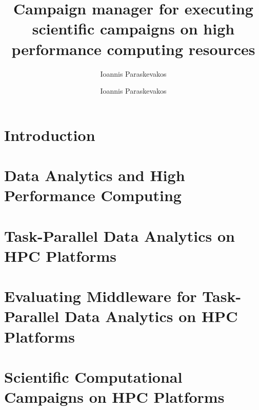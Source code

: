 \documentclass[final]{ruthesis}
\begin{document}
\author{Ioannis Paraskevakos}
\copyrightp
\title{Campaign manager for executing scientific campaigns on high performance computing resources}
\author{Ioannis Paraskevakos}
\figurespage
\tablespage

\abstract{}
\acknowledgements{}

\beforepreface
\afterpreface

\chapter{Introduction}
\label{ch:intro}


\chapter{Data Analytics and High Performance Computing}
\label{ch:pilot-data-hadoop}


\chapter{Task-Parallel Data Analytics on HPC Platforms}
\label{ch:task-par}


\chapter{Evaluating Middleware for Task-Parallel Data Analytics on HPC Platforms}
\label{ch:designs}


\chapter{Scientific Computational Campaigns on HPC Platforms}
\label{ch:cmanager}

\end{document}
